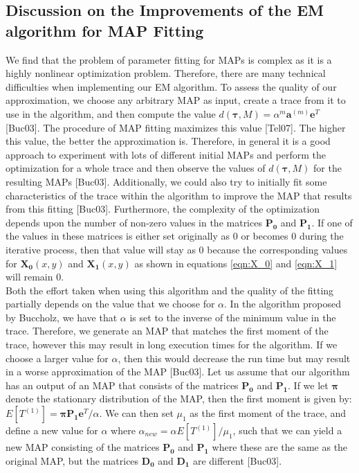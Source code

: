 \documentclass[a4paper,11pt,titlepage]{article}
\begin{document}
\subsection{Discussion on the Improvements of the EM algorithm for MAP Fitting}

We find that the problem of parameter fitting for MAPs is complex as it is a highly nonlinear optimization problem. Therefore, there are many technical difficulties when implementing our EM algorithm. To assess the quality of our approximation, we choose any arbitrary MAP as input, create a trace from it to use in the algorithm, and then compute the value $d(\bm{\tau}, M) = \alpha^m \mathbf{a}^{(m)} \mathbf{e}^T$ [Buc03]. The procedure of MAP fitting maximizes this value [Tel07]. The higher this value, the better the approximation is. Therefore, in general it is a good approach to experiment with lots of different initial MAPs and perform the optimization for a whole trace and then observe the values of $d(\bm{\tau}, M)$ for the resulting MAPs [Buc03]. Additionally, we could also try to initially fit some characteristics of the trace within the algorithm to improve the MAP that results from this fitting [Buc03]. Furthermore, the complexity of the optimization depends upon the number of non-zero values in the matrices $\mathbf{P_0}$ and $\mathbf{P_1}$. If one of the values in these matrices is either set originally as 0 or becomes 0 during the iterative process, then that value will stay as 0 because the corresponding values for $\mathbf{X_0}(x,y)$ and $\mathbf{X_1}(x,y)$ as shown in equations \ref{eqn:X_0} and \ref{eqn:X_1} will remain 0. \\

Both the effort taken when using this algorithm and the quality of the fitting partially depends on the value that we choose for $\alpha$. In the algorithm proposed by Buccholz, we have that $\alpha$ is set to the inverse of the minimum value in the trace. Therefore, we generate an MAP that matches the first moment of the trace, however this may result in long execution times for the algorithm. If we choose a larger value for $\alpha$, then this would decrease the run time but may result in a worse approximation of the MAP [Buc03]. Let us assume that our algorithm has an output of an MAP that consists of the matrices $\mathbf{P_0}$ and $\mathbf{P_1}$. If we let $\bm{\pi}$ denote the stationary distribution of the MAP, then the first moment is given by: $E[T^{(1)}] = \bm{\pi} \mathbf{P_1} \mathbf{e}^T / \alpha$. We can then set $\mu_1$ as the first moment of the trace, and define a new value for $\alpha$ where $\alpha_{new} = \alpha E[T^{(1)}]/\mu_1$, such that we can yield a new MAP consisting of the matrices $\mathbf{P_0}$ and $\mathbf{P_1}$ where these are the same as the original MAP, but the matrices $\mathbf{D_0}$ and $\mathbf{D_1}$ are different [Buc03]. \\
\end{document}
